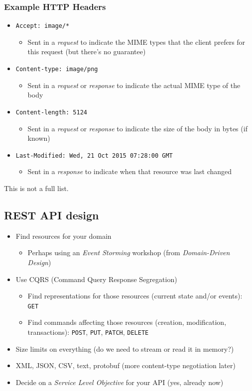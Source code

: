 \documentclass[8pt]{article}
\begin{document}
\subsubsection{Example HTTP Headers}
\label{sec:org81bf588}
\begin{itemize}
\item \texttt{Accept: image/*}
\begin{itemize}
\item Sent in a \emph{request} to indicate the MIME types that the client prefers for this request (but there's no guarantee)
\end{itemize}
\item \texttt{Content-type: image/png}
\begin{itemize}
\item Sent in a \emph{request} or \emph{response} to indicate the actual MIME type of the body
\end{itemize}
\item \texttt{Content-length: 5124}
\begin{itemize}
\item Sent in a \emph{request} or \emph{response} to indicate the size of the body in bytes (if known)
\end{itemize}
\item \texttt{Last-Modified: Wed, 21 Oct 2015 07:28:00 GMT}
\begin{itemize}
\item Sent in a \emph{response} to indicate when that resource was last changed
\end{itemize}
\end{itemize}

This is not a full list.
\subsection{REST API design}
\label{sec:org911a886}
\begin{itemize}
\item Find resources for your domain
\begin{itemize}
\item Perhaps using an \emph{Event Storming} workshop (from \emph{Domain-Driven Design})
\end{itemize}
\item Use CQRS (Command Query Response Segregation)
\begin{itemize}
\item Find representations for those resources (current state and/or events): \texttt{GET}
\item Find commands affecting those resources (creation, modification, transactions): \texttt{POST}, \texttt{PUT}, \texttt{PATCH}, \texttt{DELETE}
\end{itemize}
\item Size limits on everything (do we need to stream or read it in memory?)
\item XML, JSON, CSV, text, protobuf (more content-type negotiation later)
\item Decide on a \emph{Service Level Objective} for your API (yes, already now)
\end{itemize}
\end{document}
